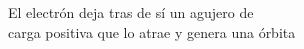\documentclass[preview]{standalone}
\begin{document}
\begin{center}
El electrón deja tras de sí un agujero de \\ carga positiva que lo atrae y genera una órbita
\end{center}
\end{document}
